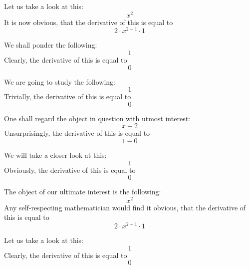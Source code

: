 \documentclass{article}
\begin{document}
Let us take a look at this:
\begin{equation}
x ^{2 } 
\end{equation}
It is now obvious, that the derivative of this is equal to
\begin{equation}
2 \cdot x ^{2 - 1 } \cdot 1 
\end{equation}

We shall ponder the following:
\begin{equation}
1 
\end{equation}
Clearly, the derivative of this is equal to
\begin{equation}
0 
\end{equation}

We are going to study the following:
\begin{equation}
1 
\end{equation}
Trivially, the derivative of this is equal to
\begin{equation}
0 
\end{equation}

One shall regard the object in question with utmost interest:
\begin{equation}
x - 2 
\end{equation}
Unsurprisingly, the derivative of this is equal to
\begin{equation}
1 - 0 
\end{equation}

We will take a closer look at this:
\begin{equation}
1 
\end{equation}
Obviously, the derivative of this is equal to
\begin{equation}
0 
\end{equation}

The object of our ultimate interest is the following:
\begin{equation}
x ^{2 } 
\end{equation}
Any self-respecting mathematician would find it obvious, that the derivative of this is equal to
\begin{equation}
2 \cdot x ^{2 - 1 } \cdot 1 
\end{equation}

Let us take a look at this:
\begin{equation}
1 
\end{equation}
Clearly, the derivative of this is equal to
\begin{equation}
0 
\end{equation}
\end{document}
